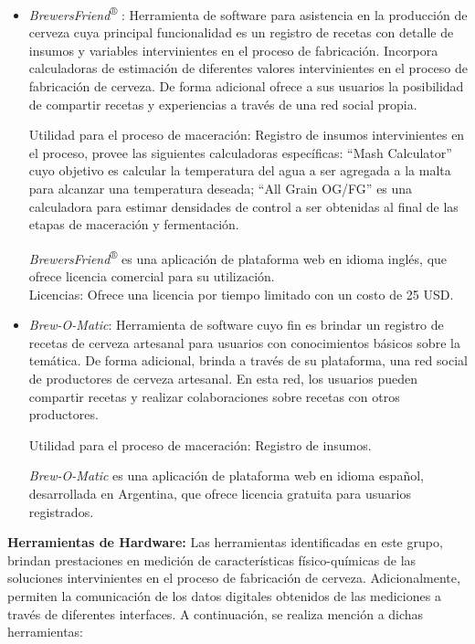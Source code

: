 \begin{itemize}
        \item{\textit{BrewersFriend}\textsuperscript{®} }: Herramienta de software para asistencia en la producción de cerveza cuya principal funcionalidad es un registro de recetas con detalle de insumos y variables intervinientes en el proceso de fabricación. Incorpora calculadoras de estimación de diferentes valores intervinientes en el proceso de fabricación de cerveza. De forma adicional ofrece a sus usuarios la posibilidad de compartir recetas y experiencias a través de una red social propia.
        \par
        Utilidad para el proceso de maceración: Registro de insumos intervinientes en el proceso, provee las siguientes calculadoras específicas: ``Mash Calculator'' cuyo objetivo es calcular la temperatura del agua a ser agregada a la malta para alcanzar una temperatura deseada; ``All Grain OG/FG'' es una calculadora para estimar densidades de control a ser obtenidas al final de las etapas de maceración y fermentación.
        \par
        \textit{BrewersFriend}\textsuperscript{®} es una aplicación de plataforma web en idioma inglés, que ofrece licencia comercial para su utilización.\\
        Licencias: Ofrece una licencia por tiempo limitado con un costo de 25 USD.
        
        \item{\textit{Brew-O-Matic}}: Herramienta de software cuyo fin es brindar un registro de recetas de cerveza artesanal para usuarios con conocimientos básicos sobre la temática. De forma adicional, brinda a través de su plataforma, una red social de productores de cerveza artesanal. En esta red, los usuarios pueden compartir recetas y realizar colaboraciones sobre recetas con otros productores.
        \par
        Utilidad para el proceso de maceración: Registro de insumos.
        \par
        \textit{Brew-O-Matic} es una aplicación de plataforma web en idioma español, desarrollada en Argentina, que ofrece licencia gratuita para usuarios registrados.
        
    \end{itemize}
    \par
    \textbf{Herramientas de Hardware:}
    Las herramientas identificadas en este grupo, brindan prestaciones en medición de características físico-químicas de las soluciones intervinientes en el proceso de fabricación de cerveza. Adicionalmente, permiten la comunicación de los datos digitales obtenidos de las mediciones a través de diferentes interfaces. A continuación, se realiza mención a dichas herramientas:
